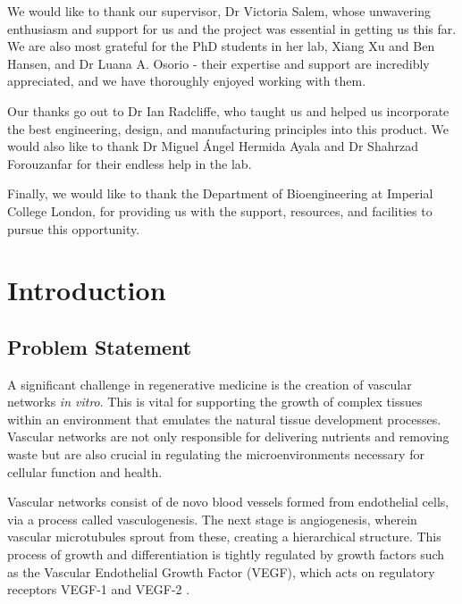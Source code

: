 \documentclass[letterpaper,12pt]{article}
\begin{document}
We would like to thank our supervisor, Dr Victoria Salem, whose unwavering enthusiasm and support for us and the project was essential in getting us this far. We are also most grateful for the PhD students in her lab, Xiang Xu and Ben Hansen, and Dr Luana A. Osorio - their expertise and support are incredibly appreciated, and we have thoroughly enjoyed working with them. 

Our thanks go out to Dr Ian Radcliffe, who taught us and helped us incorporate the best engineering, design, and manufacturing principles into this product. We would also like to thank Dr Miguel Ángel Hermida Ayala and Dr Shahrzad Forouzanfar for their endless help in the lab. 

Finally, we would like to thank the Department of Bioengineering at Imperial College London, for providing us with the support, resources, and facilities to pursue this opportunity. 


\newpage
\section{Introduction}
\subsection{Problem Statement}
A significant challenge in regenerative medicine is the creation of vascular networks \textit{in vitro}. This is vital for supporting the growth of complex tissues within an environment that emulates the natural tissue development processes. Vascular networks are not only responsible for delivering nutrients and removing waste but are also crucial in regulating the microenvironments necessary for cellular function and health.  

Vascular networks consist of de novo blood vessels formed from endothelial cells, via a process called vasculogenesis. The next stage is angiogenesis, wherein vascular microtubules sprout from these, creating a hierarchical structure. This process of growth and differentiation is tightly regulated by growth factors such as the Vascular Endothelial Growth Factor (VEGF), which acts on regulatory receptors VEGF-1 and VEGF-2 \parencite{ferrara_1999_role}.
\end{document}
